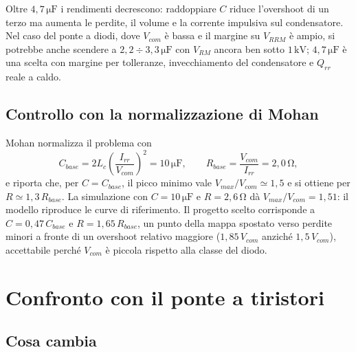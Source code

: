 \documentclass[11pt,a4paper]{article}
\newcommand{\unit}[1]{\,\mathrm{#1}}
\begin{document}
Oltre $4{,}7\unit{\mu F}$ i rendimenti decrescono: raddoppiare $C$
riduce l'overshoot di un terzo ma aumenta le perdite, il volume e la
corrente impulsiva sul condensatore. Nel caso del ponte a diodi, dove
$V_{com}$ \`e bassa e il margine su $V_{RRM}$ \`e ampio, si potrebbe anche
scendere a $2{,}2\div3{,}3\unit{\mu F}$ con $V_{RM}$ ancora ben sotto
$1\unit{kV}$; $4{,}7\unit{\mu F}$ \`e una scelta con margine per
tolleranze, invecchiamento del condensatore e $Q_{rr}$ reale a caldo.

\subsection{Controllo con la normalizzazione di Mohan}

Mohan \cite{mohan} normalizza il problema con
\begin{equation}
C_{base} = 2L_c\left(\frac{I_{rr}}{V_{com}}\right)^{\!2} = 10\unit{\mu F},
\qquad
R_{base} = \frac{V_{com}}{I_{rr}} = 2{,}0\unit{\Omega},
\end{equation}
e riporta che, per $C = C_{base}$, il picco minimo vale
$V_{max}/V_{com} \simeq 1{,}5$ e si ottiene per $R \simeq 1{,}3\,R_{base}$.
La simulazione con $C=10\unit{\mu F}$ e $R=2{,}6\unit{\Omega}$ d\`a
$V_{max}/V_{com} = 1{,}51$: il modello riproduce le curve di
riferimento. Il progetto scelto corrisponde a $C = 0{,}47\,C_{base}$ e
$R = 1{,}65\,R_{base}$, un punto della mappa spostato verso perdite
minori a fronte di un overshoot relativo maggiore ($1{,}85\,V_{com}$
anzich\'e $1{,}5\,V_{com}$), accettabile perch\'e $V_{com}$ \`e piccola
rispetto alla classe del diodo.

\section{Confronto con il ponte a tiristori}
\label{sec:tiristori}

\subsection{Cosa cambia}
\end{document}
